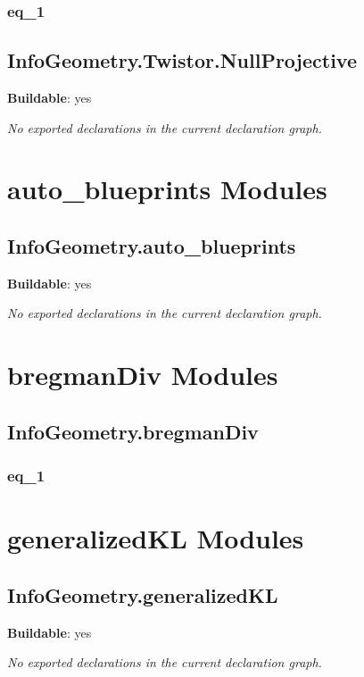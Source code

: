 \subsection*{eq_1}

\begin{theorem}[blueprint="infogeometry:twistor:isnull:eq_1"]
\end{theorem}

\section{InfoGeometry.Twistor.NullProjective}

\noindent\textbf{Buildable}: yes

\noindent\emph{No exported declarations in the current declaration graph.}

\chapter{auto_blueprints Modules}

\section{InfoGeometry.auto_blueprints}

\noindent\textbf{Buildable}: yes

\noindent\emph{No exported declarations in the current declaration graph.}

\chapter{bregmanDiv Modules}

\section{InfoGeometry.bregmanDiv}

\subsection*{eq_1}

\begin{theorem}[blueprint="infogeometry:bregmandiv:eq_1"]
\end{theorem}

\chapter{generalizedKL Modules}

\section{InfoGeometry.generalizedKL}

\noindent\textbf{Buildable}: yes

\noindent\emph{No exported declarations in the current declaration graph.}

